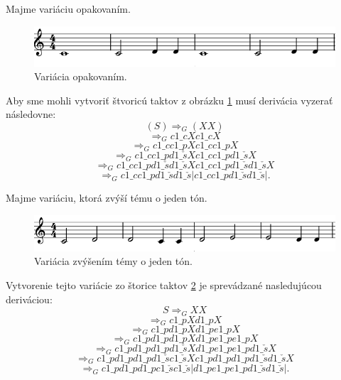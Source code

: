 \begin{example}
Majme variáciu opakovaním.
\begin{figure}[H]
    \centering
    \includegraphics[scale=0.4]{thesis/obrazky-figures/copyvar.png}
    \caption{Variácia opakovaním.}
    \label{fig:copyvar}
    \end{figure}
    Aby sme mohli vytvoriť štvoricú taktov z obrázku \ref{fig:copyvar} musí derivácia vyzerať následovne: $$ (S) \Rightarrow_G (XX) $$ 
    $$\Rightarrow_G c1\_cXc1\_cX$$ 
    $$\Rightarrow_G c1\_cc1\_pXc1\_cc1\_pX$$ 
    $$\Rightarrow_G c1\_cc1\_pd1\_\check{s}Xc1\_cc1\_pd1\_\check{s}X$$ 
    $$\Rightarrow_G c1\_cc1\_pd1\_\check{s}d1\_\check{s}Xc1\_cc1\_pd1\_\check{s}d1\_\check{s}X$$
    $$\Rightarrow_G c1\_cc1\_pd1\_\check{s}d1\_\check{s}|c1\_cc1\_pd1\_\check{s}d1\_\check{s}|.$$
\end{example}

\begin{example}
Majme variáciu, ktorá zvýší tému o jeden tón.
\begin{figure}[H]
    \centering
    \includegraphics[scale=0.4]{thesis/obrazky-figures/sequp.png}
    \caption{Variácia zvýšením témy o jeden tón.}
    \label{fig:zvysenievar}
    \end{figure}
    Vytvorenie tejto variácie zo štorice taktov \ref{fig:zvysenievar} je sprevádzané nasledujúcou deriváciou:
    $$ S \Rightarrow_G XX $$
    $$\Rightarrow_G  c1\_pXd1\_pX$$
    $$\Rightarrow_G  c1\_pd1\_pXd1\_pe1\_pX$$
    $$\Rightarrow_G  c1\_pd1\_pd1\_pXd1\_pe1\_pe1\_pX$$
    $$\Rightarrow_G  c1\_pd1\_pd1\_pd1\_\check{s}Xd1\_pe1\_pe1\_pd1\_\check{s}X$$
    $$\Rightarrow_G  c1\_pd1\_pd1\_pd1\_\check{s}c1\_\check{s}Xc1\_pd1\_pd1\_pd1\_\check{s}d1\_\check{s}X$$
    $$\Rightarrow_G  c1\_pd1\_pd1\_pc1\_\check{s}c1\_\check{s}|d1\_pe1\_pe1\_pd1\_\check{s}d1\_\check{s}|.$$
\end{example}

